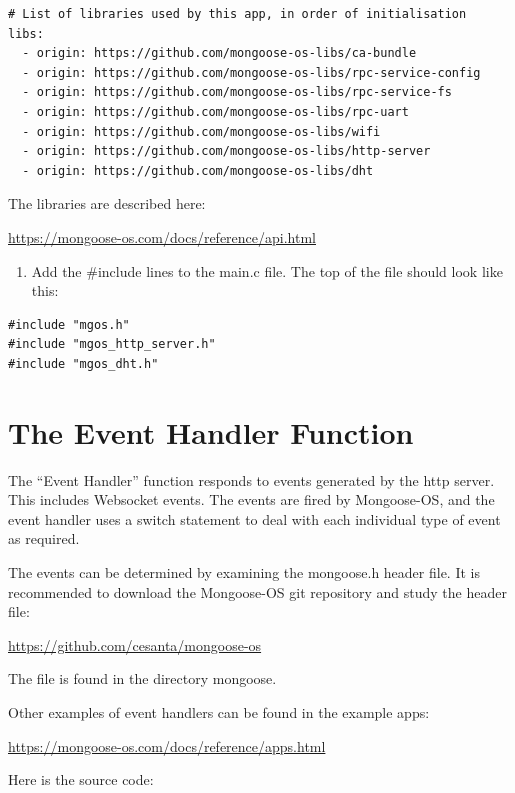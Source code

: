 \documentclass[letterpaper,]{book}
\providecommand{\tightlist}{%
  \setlength{\itemsep}{0pt}\setlength{\parskip}{0pt}}
\begin{document}
\begin{verbatim}
# List of libraries used by this app, in order of initialisation
libs:
  - origin: https://github.com/mongoose-os-libs/ca-bundle
  - origin: https://github.com/mongoose-os-libs/rpc-service-config
  - origin: https://github.com/mongoose-os-libs/rpc-service-fs
  - origin: https://github.com/mongoose-os-libs/rpc-uart
  - origin: https://github.com/mongoose-os-libs/wifi
  - origin: https://github.com/mongoose-os-libs/http-server
  - origin: https://github.com/mongoose-os-libs/dht
\end{verbatim}

The libraries are described here:

\url{https://mongoose-os.com/docs/reference/api.html}

\begin{enumerate}
\def\labelenumi{\arabic{enumi}.}
\setcounter{enumi}{1}
\tightlist
\item
  Add the \#include lines to the main.c file. The top of the file should
  look like this:
\end{enumerate}

\begin{verbatim}
#include "mgos.h"
#include "mgos_http_server.h"
#include "mgos_dht.h"
\end{verbatim}

\section{The Event Handler Function}\label{the-event-handler-function}

The ``Event Handler'' function responds to events generated by the http
server. This includes Websocket events. The events are fired by
Mongoose-OS, and the event handler uses a switch statement to deal with
each individual type of event as required.

The events can be determined by examining the mongoose.h header file. It
is recommended to download the Mongoose-OS git repository and study the
header file:

\url{https://github.com/cesanta/mongoose-os}

The file is found in the directory mongoose.

Other examples of event handlers can be found in the example apps:

\url{https://mongoose-os.com/docs/reference/apps.html}

Here is the source code:
\end{document}
